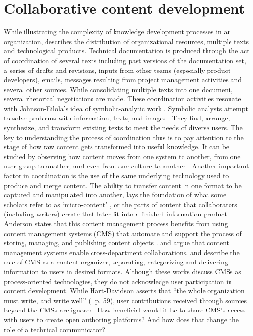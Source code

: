 \section{Collaborative content development}
While illustrating the complexity of knowledge development processes in an organization, \textcite{slattery2007undistributing} describes the distribution of organizational resources, multiple texts and technological products. Technical documentation is produced through the act of coordination of several texts including past versions of the documentation set, a series of drafts and revisions, inputs from other teams (especially product developers), emails, messages resulting from project management activities and several other sources. While consolidating multiple texts into one document, several rhetorical negotiations are made. These coordination activities resonate with Johnson-Eilola’s idea of symbolic-analytic work \cite{johnson1996relocating}. Symbolic analysts attempt to solve problems with information, texts, and images \cite{johnson1996relocating}. They find, arrange, synthesize, and transform existing texts to meet the needs of diverse users. The key to understanding the process of coordination thus is to pay attention to the stage of how raw content gets transformed into useful knowledge. It can be studied by observing how content moves from one system to another, from one user group to another, and even from one culture to another \cite{johnson2013solving}. Another important factor in coordination is the use of the same underlying technology used to produce and merge content. The ability to transfer content in one format to be captured and manipulated into another, lays the foundation of what some scholars refer to as ‘micro-content’ \cite{shank2008web, johnson1996relocating}, or the parts of content that collaborators (including writers) create that later fit into a finished information product. Anderson states that this content management process benefits from using content management systems (CMS) that automate and support the process of storing, managing, and publishing content objects \cite{andersen2011component}.  \textcite{jenkins2004cultural} and \textcite{hart2010content} argue that content management systems enable cross-department collaborations. \textcite{hackos2002content} and  \textcite{clark2007content} describe the role of CMS as a content organizer, separating, categorizing and delivering information to users in desired formats. Although these works discuss CMSs as process-oriented technologies, they do not acknowledge user participation in content development. While Hart-Davidson asserts that “the whole organization must write, and write well” (\cite{johnson2013solving}, p. 59), user contributions received through sources beyond the CMSs are ignored. How beneficial would it be to share CMS’s access with users to create open authoring platforms? And how does that change the role of a technical communicator?

